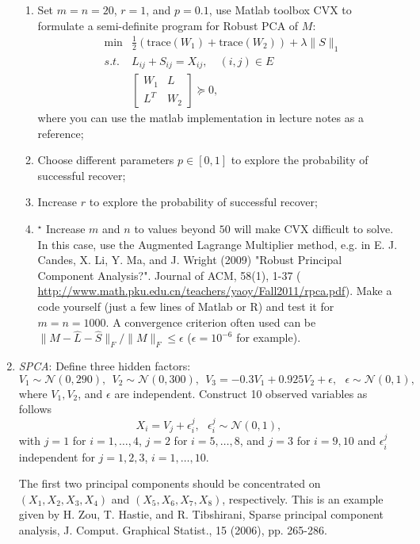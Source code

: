 \documentclass[11pt]{article}
\def\NN{{\mathcal N}}
\def\tr{{\mathrm{trace}}}
\begin{document}
\begin{enumerate}
\begin{enumerate}
\item Set $m=n=20$, $r=1$, and $p=0.1$, use Matlab toolbox CVX to formulate a semi-definite program for Robust PCA of $M$:
\begin{eqnarray} \label{eq:RPCA_SDP}
& \min & \frac{1}{2} (\tr(W_1)+\tr(W_2)) + \lambda \|S\|_1 \\
& s.t. & L_{ij} +S_{ij} = X_{ij}, \quad (i,j)\in E  \nonumber \\
& & \displaystyle \left[ \begin{array}{cc} 
W_1 & L \\
L^T & W_2
\end{array}
\right] \succeq 0, \nonumber
\end{eqnarray}
where you can use the matlab implementation in lecture notes as a reference;
\item Choose different parameters $p\in [0,1]$ to explore the probability of successful recover;
\item Increase $r$ to explore the probability of successful recover;
\item $^\star$ Increase $m$ and $n$ to values beyond $50$ will make CVX difficult to solve. In this case, use the Augmented Lagrange Multiplier method, e.g. in E. J. Candes, X. Li, Y. Ma, and J. Wright (2009) "Robust Principal Component Analysis?". Journal of ACM, 58(1), 1-37 (
\url{http://www.math.pku.edu.cn/teachers/yaoy/Fall2011/rpca.pdf}). Make a code yourself (just a few lines of Matlab or R) and test it for $m=n=1000$. A convergence criterion often used can be $\|M-\hat{L} - \hat{S} \|_F / \|M\|_F \leq \epsilon$ ($\epsilon=10^{-6}$ for example).  
\end{enumerate}


\item {\em SPCA}: Define three hidden factors: 
\[ V_1 \sim \NN(0,290), \ \ V_2 \sim \NN(0,300), \ \ V_3 = -0.3 V_1 + 0.925  V_2 + \epsilon, \ \ \ \epsilon \sim \NN(0,1), \]
where $V_1,V_2$, and $\epsilon$ are independent. Construct 10 observed variables as follows
\[ X_i = V_j + \epsilon^j_i, \ \ \ \epsilon^j_i \sim \NN(0,1), \] 
with $j=1$ for $i=1,\ldots,4$, $j=2$ for $i=5,\ldots,8$, and $j=3$ for $i=9,10$ and $\epsilon^j_i$ independent for $j=1,2,3$, $i=1,\ldots,10$. 

The first two principal components should be concentrated on $(X_1,X_2,X_3,X_4)$ and $(X_5,X_6,X_7,X_8)$, respectively. This is an example given
by H. Zou, T. Hastie, and R. Tibshirani, Sparse principal component analysis, J. Comput. Graphical Statist., 15 (2006), pp. 265-286.


\end{enumerate}
\end{document}
